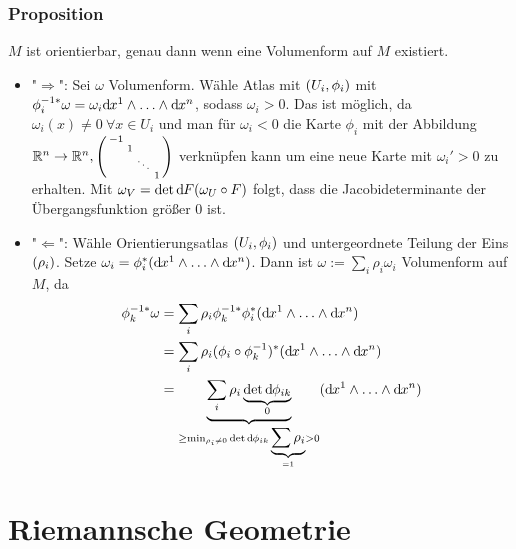 \subsubsection{Proposition}
\label{ssub:1103}
$M$ ist orientierbar, genau dann wenn eine Volumenform auf $M$ existiert.
\begin{itemize}
\item "$\Rightarrow$": Sei $\omega$ Volumenform. Wähle Atlas mit $\enbrace{U_i,\phi_i}$ mit $\phi_i^{-1*} \omega = \omega_i \mathd x^1 \wedge \ldots \wedge \mathd x^n$, sodass $\omega_i > 0$. Das ist möglich, da $\omega_i(x) \neq 0\ \forall x\in U_i$ und man für $\omega_i < 0$ die Karte $\phi_i$ mit der Abbildung $\mathds{R}^n \to \mathds{R}^n, 
\begin{psmallmatrix}
-1&&&\\
&1&&\\
&&\ddots&\\
&&&1
\end{psmallmatrix}$ verknüpfen kann um eine neue Karte mit $\omega_i' > 0$ zu erhalten. Mit $\omega_V = \det \mathd F(\omega_U \circ F)$ folgt, dass die Jacobideterminante der Übergangsfunktion größer $0$ ist.
\item "$\Leftarrow$": Wähle Orientierungsatlas $\enbrace{U_i,\phi_i}$ und untergeordnete Teilung der Eins $\enbrace{\rho_i}$. Setze $\omega_i = \phi_i^*\enbrace{\mathd x^1 \wedge \ldots \wedge \mathd x^n}$. Dann ist $\omega := \sum_i \rho_i \omega_i$ Volumenform auf $M$, da
\begin{align*}
\phi_k^{-1*} \omega &= \sum_i \rho_i \phi_k^{-1*} \phi_i^* \enbrace{\mathd x^1 \wedge \ldots \wedge \mathd x^n}\\
&= \sum_i \rho_i \enbrace{\phi_i\circ \phi_k^{-1}}^* \enbrace{\mathd x^1 \wedge \ldots \wedge \mathd x^n}\\
&= \underbrace{\sum_i \rho_i \underbrace{\det \mathd \phi_{ik}}_{0}}_{\geq \min_{\rho_i \neq 0} \det \mathd \phi_{ik} \underbrace{\sum \rho_i}_{=1} > 0} \enbrace{\mathd x^1 \wedge \ldots \wedge \mathd x^n}\\
\end{align*}
\end{itemize}



\section{Riemannsche Geometrie}
\label{sec:2}

